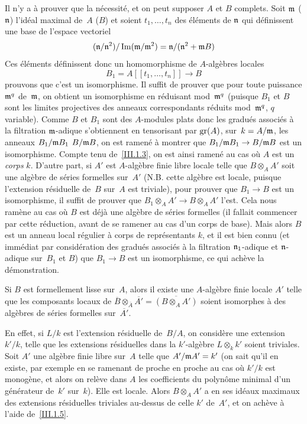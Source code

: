 Il n'y a \`a prouver que la n\'ecessit\'e, et on peut supposer
$A$ et $B$ complets. Soit $\mathfrak{m}$ ($\mathfrak{n}$) l'id\'eal maximal
de~$A$ ($B$) et soient $t_1,\dots, t_n$ des \'el\'ements de
$\mathfrak{n}$ qui d\'efinissent une base de l'espace vectoriel
$$
(\mathfrak{n}/\mathfrak{n}^2)/ \operatorname{Im} (\mathfrak{m}/\mathfrak{m}^2)=
\mathfrak{n}/(\mathfrak{n}^2 +\mathfrak{m}B)
$$
Ces \'el\'ements d\'efinissent donc un homomorphisme de
$A$-alg\`ebres locales
$$
B_1= A[[t_1,\dots,t_n]] \to B
$$
prouvons
que c'est un isomorphisme. Il suffit de prouver que pour toute
puissance $\mathfrak{m}^q$ de~$\mathfrak{m}$, on obtient un isomorphisme en
r\'eduisant mod~$\mathfrak{m}^q$ (puisque $B_1$ et $B$ sont les
limites projectives des anneaux correspondants r\'eduits
mod~$\mathfrak{m}^q$, $q$ variable). Comme $B$ et $B_1$ sont des
$A$-modules plats donc les gradu\'es associ\'es \`a la
filtration $\mathfrak{m}$-adique s'obtiennent en tensorisant par $\operatorname{gr}
(A)$, sur~$k=A/\mathfrak{m}$, les anneaux $B_1/\mathfrak{m}B_1$
\resp $B/\mathfrak{m}B$, on est ramen\'e \`a montrer que
$B_1/\goth{m}B_1\to B/\goth{m}B$ est un isomorphisme. Compte tenu
de~\ref{III.1.3}, on est ainsi ramen\'e au cas o\`u $A$ est un
\emph{corps} $k$. D'autre part, si $A'$ est $A$-alg\`ebre finie
libre locale telle que $B\otimes_A A'$ soit une alg\`ebre de
s\'eries formelles sur~$A'$ (N.B. cette alg\`ebre est locale,
puisque l'extension r\'esiduelle de~$B$ sur~$A$ est triviale), pour
prouver que $B_1\to B$ est un isomorphisme, il suffit de prouver que
$B_1\otimes_A A'\to B\otimes_A A'$ l'est. Cela nous ram\`ene au cas
o\`u $B$ est d\'ej\`a une alg\`ebre de s\'eries formelles
(il fallait commencer par cette r\'eduction, avant de se ramener au
cas d'un corps de base). Mais alors $B$ est un anneau local
r\'egulier \`a corps de repr\'esentants $k$, et il est bien
connu (et imm\'ediat par consid\'eration des gradu\'es
associ\'es \`a la filtration $\mathfrak{n}_1 $-adique et
$\mathfrak{n}$-adique sur~$B_1$ et $B$) que $B_1 \to B$ est un
isomorphisme, ce qui ach\`eve la d\'emonstration.

\begin{corollaire}
\label{III.1.6}
Si $B$ est formellement lisse sur~$A$, alors il existe une
$A$-alg\`ebre finie locale $A'$ telle que les composants locaux de
$\overline{B}\otimes_{\overline{A}}
\overline{A'}=\overline{(B\otimes_A A')}$ soient isomorphes \`a des
alg\`ebres de s\'eries formelles sur~$\overline{A'}$.
\end{corollaire}
En effet, si $L/k$ est l'extension r\'esiduelle de~$B/A$, on
consid\`ere une extension $k'/k$, telle que les extensions
r\'esiduelles dans la $k'$-alg\`ebre $L\otimes_k k'$ soient
triviales. Soit $A'$ une alg\`ebre finie libre sur~$A$ telle que
$A'/\mathfrak{m}A'=k'$ (on sait qu'il en existe, par exemple en se
ramenant de proche en proche au cas o\`u $k'/k$ est monog\`ene, et
alors on rel\`eve dans $A$ les coefficients du polyn\^ome minimal
d'un g\'en\'erateur de~$k'$ sur~$k$). Elle est locale. Alors
$B\otimes_A A'$ a en ses id\'eaux maximaux des extensions
r\'esiduelles triviales au-dessus de celle $k'$ de~$A'$, et on
ach\`eve \`a l'aide de~\ref{III.1.5}.

